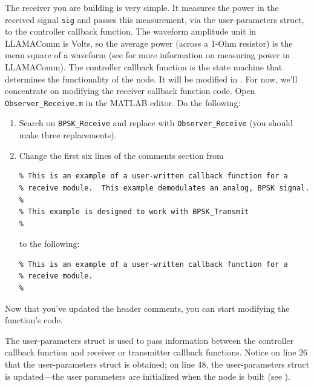 The receiver you are building is very simple. It measures the power in the received signal \verb+sig+ and passes this measurement, via the user-parameters struct, to the controller callback function.  The waveform amplitude unit in LLAMAComm is Volts, so the average power (across a 1-Ohm resistor) is the mean square of a waveform (see  for more information on measuring power in LLAMAComm).  The controller callback function is the state machine that determines the functionality of the node.  It will be modified in .  For now, we'll concentrate on modifying the receiver callback function code.
Open \verb+Observer_Receive.m+ in the MATLAB editor.  Do the following:
\begin{enumerate}
\item Search on \verb+BPSK_Receive+ and replace with \verb+Observer_Receive+ (you should make three replacements).

\item Change the first six lines of the comments section from
\begin{lstlisting}[numbers=none]
% Function Observer_Receive.m:
% This is an example of a user-written callback function for a
% receive module.  This example demodulates an analog, BPSK signal.
%
% This example is designed to work with BPSK_Transmit
%
\end{lstlisting}
%
to the following:
%
\begin{lstlisting}[numbers=none]
% Function Observer_Receive.m:
% This is an example of a user-written callback function for a
% receive module.
%
\end{lstlisting}
%
\end{enumerate}
Now that you've updated the header comments, you can start modifying the function's code.

The user-parameters struct is used to pass information between the controller callback function and receiver or transmitter callback functions.  Notice on line 26 that the user-parameters struct is obtained; on line 48, the user-parameters struct is updated---the user parameters are initialized when the node is built (see ).


